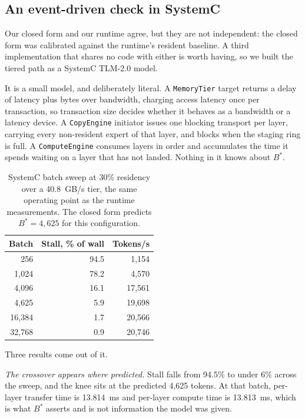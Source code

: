 \documentclass[10pt,a4paper]{article}
\begin{document}
\subsection{An event-driven check in SystemC}
\label{sec:systemc}

Our closed form and our runtime agree, but they are not independent: the closed
form was calibrated against the runtime's resident baseline. A third
implementation that shares no code with either is worth having, so we built the
tiered path as a SystemC TLM-2.0 model.

It is a small model, and deliberately literal. A \texttt{MemoryTier} target returns
a delay of latency plus bytes over bandwidth, charging access latency once per
transaction, so transaction size decides whether it behaves as a bandwidth or a
latency device. A \texttt{CopyEngine} initiator issues one blocking transport per
layer, carrying every non-resident expert of that layer, and blocks when the
staging ring is full. A \texttt{ComputeEngine} consumes layers in order and
accumulates the time it spends waiting on a layer that has not landed. Nothing
in it knows about $B^{*}$.

\begin{table}[htbp]
\centering\small
\caption{SystemC batch sweep at 30\% residency over a 40.8~GB/s tier, the same
operating point as the runtime measurements. The closed form predicts
$B^{*}=4{,}625$ for this configuration.}
\label{tab:systemc}
\begin{tabular}{rrr}
\toprule
Batch & Stall, \% of wall & Tokens/s \\
\midrule
256      & 94.5 &  1{,}154 \\
1{,}024  & 78.2 &  4{,}570 \\
4{,}096  & 16.1 & 17{,}561 \\
4{,}625  &  5.9 & 19{,}698 \\
16{,}384 &  1.7 & 20{,}566 \\
32{,}768 &  0.9 & 20{,}746 \\
\bottomrule
\end{tabular}
\end{table}


Three results come out of it.

\emph{The crossover appears where predicted.} Stall falls from 94.5\% to under
6\% across the sweep, and the knee sits at the predicted 4{,}625 tokens. At that
batch, per-layer transfer time is 13.814~ms and per-layer compute time is
13.813~ms, which is what $B^{*}$ asserts and is not information the model was
given.
\end{document}
